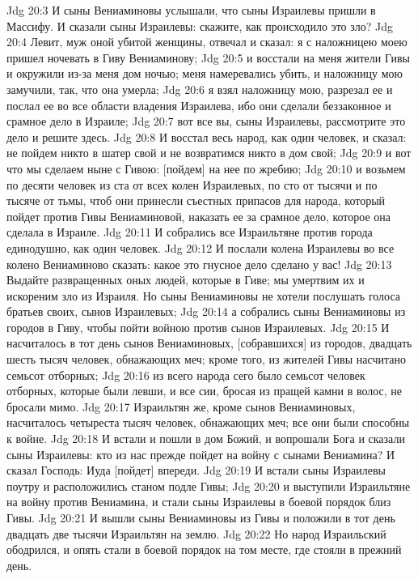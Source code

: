 Jdg 20:3  И сыны Вениаминовы услышали, что сыны Израилевы пришли в Массифу. И сказали сыны Израилевы: скажите, как происходило это зло?
Jdg 20:4  Левит, муж оной убитой женщины, отвечал и сказал: я с наложницею моею пришел ночевать в Гиву Вениаминову;
Jdg 20:5  и восстали на меня жители Гивы и окружили из-за меня дом ночью; меня намеревались убить, и наложницу мою замучили, так, что она умерла;
Jdg 20:6  я взял наложницу мою, разрезал ее и послал ее во все области владения Израилева, ибо они сделали беззаконное и срамное дело в Израиле;
Jdg 20:7  вот все вы, сыны Израилевы, рассмотрите это дело и решите здесь.
Jdg 20:8  И восстал весь народ, как один человек, и сказал: не пойдем никто в шатер свой и не возвратимся никто в дом свой;
Jdg 20:9  и вот что мы сделаем ныне с Гивою: [пойдем] на нее по жребию;
Jdg 20:10  и возьмем по десяти человек из ста от всех колен Израилевых, по сто от тысячи и по тысяче от тьмы, чтоб они принесли съестных припасов для народа, который пойдет против Гивы Вениаминовой, наказать ее за срамное дело, которое она сделала в Израиле.
Jdg 20:11  И собрались все Израильтяне против города единодушно, как один человек.
Jdg 20:12  И послали колена Израилевы во все колено Вениаминово сказать: какое это гнусное дело сделано у вас!
Jdg 20:13  Выдайте развращенных оных людей, которые в Гиве; мы умертвим их и искореним зло из Израиля. Но сыны Вениаминовы не хотели послушать голоса братьев своих, сынов Израилевых;
Jdg 20:14  а собрались сыны Вениаминовы из городов в Гиву, чтобы пойти войною против сынов Израилевых.
Jdg 20:15  И насчиталось в тот день сынов Вениаминовых, [собравшихся] из городов, двадцать шесть тысяч человек, обнажающих меч; кроме того, из жителей Гивы насчитано семьсот отборных;
Jdg 20:16  из всего народа сего было семьсот человек отборных, которые были левши, и все сии, бросая из пращей камни в волос, не бросали мимо.
Jdg 20:17  Израильтян же, кроме сынов Вениаминовых, насчиталось четыреста тысяч человек, обнажающих меч; все они были способны к войне.
Jdg 20:18  И встали и пошли в дом Божий, и вопрошали Бога и сказали сыны Израилевы: кто из нас прежде пойдет на войну с сынами Вениамина? И сказал Господь: Иуда [пойдет] впереди.
Jdg 20:19  И встали сыны Израилевы поутру и расположились станом подле Гивы;
Jdg 20:20  и выступили Израильтяне на войну против Вениамина, и стали сыны Израилевы в боевой порядок близ Гивы.
Jdg 20:21  И вышли сыны Вениаминовы из Гивы и положили в тот день двадцать две тысячи Израильтян на землю.
Jdg 20:22  Но народ Израильский ободрился, и опять стали в боевой порядок на том месте, где стояли в прежний день.
